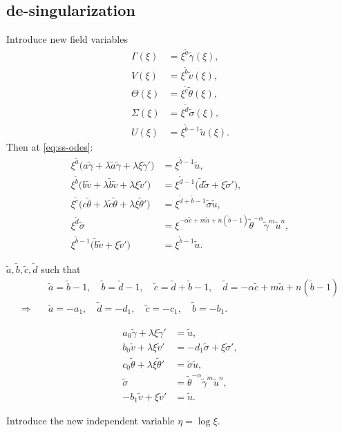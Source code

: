\documentclass[a4paper,11pt]{article}
\def\tg{{\tilde{\gamma}}}
\def\tv{{\tilde{v}}}
\def\tth{{\tilde{\theta}}}
\def\ts{{\tilde{\sigma}}}
\def\tu{{\tilde{u}}}
\def\ta{{\tilde{a}}}
\def\tb{{\tilde{b}}}
\def\tc{{\tilde{c}}}
\def\td{{\tilde{d}}}
\begin{document}
\subsection{de-singularization}
Introduce new field variables
\begin{equation}
\begin{aligned}
 \Gamma(\xi) &= \xi^\ta \tg(\xi),\\
 V(\xi)&=\xi^\tb \tv(\xi),\\
 \Theta(\xi)&=\xi^\tc \tth(\xi),\\
 \Sigma(\xi)&=\xi^\td \ts(\xi),\\
 U(\xi)&=\xi^{\tb-1} \tu(\xi).
\end{aligned}
\end{equation}
Then at \eqref{eq:ss-odes}:
\begin{align*}
 \xi^\ta\Big( a\tg + \lambda \ta \tg + \lambda\xi\tg'\Big) &=\xi^{\tb-1} \tu,\\
 \xi^\tb\Big( b\tv + \lambda \tb \tv + \lambda\xi\tv'\Big) &=\xi^{\td-1} \Big(\td\ts + \xi\ts'\Big),\\
 \xi^\tc\Big( c\tth+ \lambda \tc \tth+ \lambda\xi\tth'\Big)&=\xi^{\td+\tb-1} \ts\tu,\\
 \xi^\td\ts &= \xi^{-\alpha \tc +m\ta +n(\tb-1)} \tth^{-\alpha} \tg^m \tu^n,\\
 \xi^{\tb-1}\Big(\tb\tv + \xi \tv'\Big)&= \xi^{\tb-1} \tu.
\end{align*}

$\ta, \tb, \tc, \td$ such that
\begin{align*}
 &\ta=\tb-1, \quad \tb=\td-1, \quad \tc=\td+\tb-1,\quad \td = -\alpha \tc + m\ta +n(\tb-1) \\
 \Longrightarrow \quad&\ta = -a_1, \quad \td = -d_1, \quad \tc = -c_1, \quad \tb=-b_1.
\end{align*}

\begin{equation} \label{eq:tildesys}
 \begin{aligned}
  a_0\tg + \lambda\xi\tg' &=\tu,\\
  b_0\tv + \lambda\xi\tv' &=-d_1 \ts + \xi\ts',\\
  c_0\tth+ \lambda\xi\tth'&=\ts\tu,\\
  \ts &=\tth^{-\alpha}\tg^m\tu^n,\\
  -b_1\tv+\xi\tv' &= \tu.
 \end{aligned}
\end{equation}

Introduce the new independent variable $\eta = \log\xi$.
\end{document}
